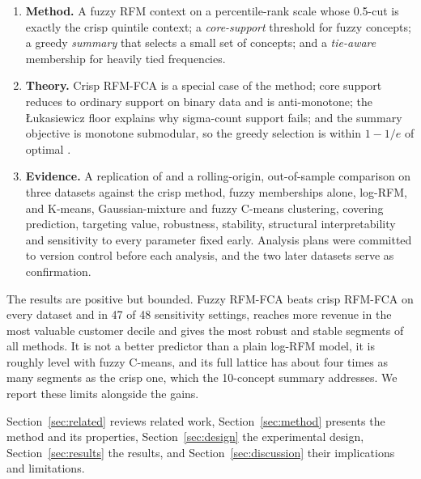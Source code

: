 \begin{enumerate}
\item \textbf{Method.} A fuzzy RFM context on a percentile-rank scale whose 0.5-cut is exactly the crisp quintile context; a \emph{core-support} threshold for fuzzy concepts; a greedy \emph{summary} that selects a small set of concepts; and a \emph{tie-aware} membership for heavily tied frequencies.
\item \textbf{Theory.} Crisp RFM-FCA is a special case of the method; core support reduces to ordinary support on binary data and is anti-monotone; the Łukasiewicz floor explains why sigma-count support fails; and the summary objective is monotone submodular, so the greedy selection is within $1-1/e$ of optimal \citep{nemhauser1978}.
\item \textbf{Evidence.} A replication of \citet{rungruang2024} and a rolling-origin, out-of-sample comparison on three datasets against the crisp method, fuzzy memberships alone, log-RFM, and K-means, Gaussian-mixture and fuzzy C-means clustering, covering prediction, targeting value, robustness, stability, structural interpretability and sensitivity to every parameter fixed early. Analysis plans were committed to version control before each analysis, and the two later datasets serve as confirmation.
\end{enumerate}

The results are positive but bounded. Fuzzy RFM-FCA beats crisp RFM-FCA on every dataset and in 47 of 48 sensitivity settings, reaches more revenue in the most valuable customer decile and gives the most robust and stable segments of all methods. It is not a better predictor than a plain log-RFM model, it is roughly level with fuzzy C-means, and its full lattice has about four times as many segments as the crisp one, which the 10-concept summary addresses. We report these limits alongside the gains.

Section~\ref{sec:related} reviews related work, Section~\ref{sec:method} presents the method and its properties, Section~\ref{sec:design} the experimental design, Section~\ref{sec:results} the results, and Section~\ref{sec:discussion} their implications and limitations.
